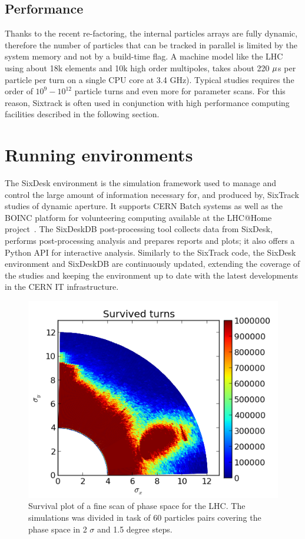 \documentclass[a4paper,
              ]{jacow}
\begin{document}
\subsection{Performance}

Thanks to the recent re-factoring, the internal particles arrays are fully dynamic, therefore the number of particles that can be tracked in parallel is limited by the system memory and not by a build-time flag. A machine model like the LHC using about 18k elements and 10k high order multipoles, takes about 220 ${\rm \mu}$s per particle per turn on a single CPU core at 3.4 GHz). Typical studies requires the order of $10^9 - 10^12$ particle turns and even more for parameter scans. For this reason, Sixtrack is often used in conjunction with high performance computing facilities described in the following section.


\section{Running environments}
The SixDesk environment \cite{sixdesk} is the simulation framework used to manage and control the large amount of information necessary for, and produced by, SixTrack studies of dynamic aperture. It supports CERN Batch systems \cite{cernbatch} as well as the BOINC platform for volunteering computing available at the LHC@Home project~\cite{lhcathome}.
The SixDeskDB post-processing tool collects data from SixDesk, performs post-processing analysis and prepares reports and plots; it also offers a Python API for interactive analysis.
Similarly to the SixTrack code, the SixDesk environment and SixDeskDB are continuously updated, extending the coverage of the studies and keeping the environment up to date with the latest developments in the CERN IT infrastructure.

\begin{figure}[!tbh]
\centering
 \includegraphics[width=\columnwidth]{surv_plot1.png}
 \caption{Survival plot of a fine scan of phase space for the LHC. The simulations was divided in task of 60 particles pairs covering the phase space in 2 $\sigma$ and 1.5 degree steps.}
 \label{fig:study}
\end{figure}
\end{document}
